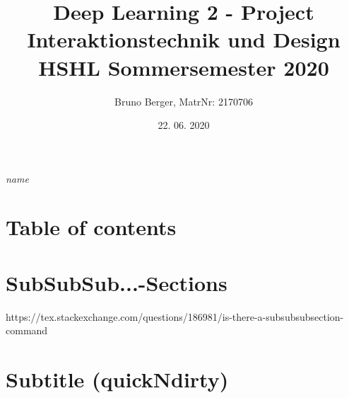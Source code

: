 \begin{flushright}
\emph{name}
\end{flushright}

\section{Table of contents}



\section{SubSubSub...-Sections}

https://tex.stackexchange.com/questions/186981/is-there-a-subsubsubsection-command


\section{Subtitle (quickNdirty)}

\title{Deep Learning 2 - Project\\
    \vspace{+14pt}
        \Large Interaktionstechnik und Design \\
        HSHL  Sommersemester 2020}
\author{Bruno Berger, MatrNr: 2170706}
\date{22. 06. 2020}
